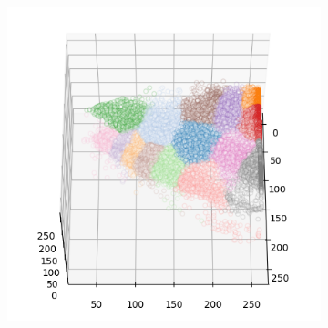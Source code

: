 \begin{figure}[htbp]
\begin{subfigure}[t]{0.32\textwidth}
    \end{subfigure}
    \begin{subfigure}[t]{0.32\textwidth}
        \includegraphics[width=\linewidth]{../../python_code/plots/kmeans/cat-101/clusters_elev60_azim0.png}
    \end{subfigure}
\end{figure}

